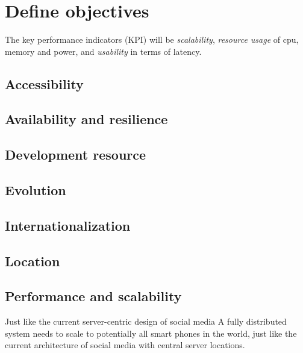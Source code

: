\section{Define objectives} %



The key performance indicators (KPI) will be \emph{scalability}, \emph{resource usage} of cpu, memory and power, and \emph{usability} in terms of latency.


\subsection{Accessibility}

\subsection{Availability and resilience}

\subsection{Development resource}

\subsection{Evolution}

\subsection{Internationalization}

\subsection{Location}

\subsection{Performance and scalability}
Just like the current server-centric design of social media
A fully distributed system needs to scale to potentially all smart phones in the world, just like the current architecture of social media with central server locations.

